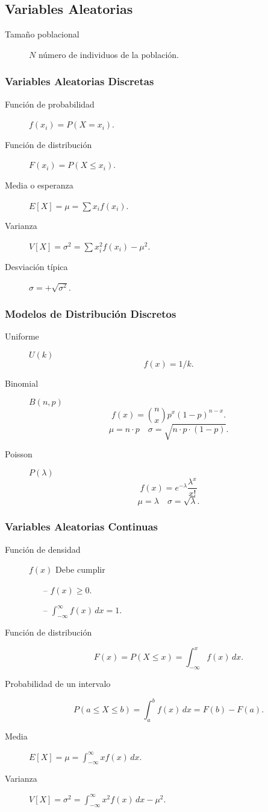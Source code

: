 \documentclass[a4paper,dvips]{article}
\newlength{\mylength}
\newenvironment{marco}{
	\setlength{\fboxsep}{5pt}
	\setlength{\mylength}{\textwidth}
	\addtolength{\mylength}{-2\fboxsep}
	\addtolength{\mylength}{-2\fboxrule}
	\noindent
	\begin{Sbox}
	\begin{minipage}{\mylength}
	\setlength{\abovedisplayskip}{3pt}
	\setlength{\belowdisplayskip}{3pt}
}
{
	\end{minipage}
	\end{Sbox}
	\fbox{\TheSbox}
}
\begin{document}
\subsection*{Variables Aleatorias}
\begin{marco}
\begin{multicols}{2}
\begin{description}
\item [Tamaño poblacional] $N$ número de individuos de la población.
\end{description}
\subsubsection*{Variables Aleatorias Discretas}
\begin{description}
\item [Función de probabilidad] $f(x_i)=P(X=x_i)$.
\item [Función de distribución] $F(x_i)=P(X\leq x_i)$.
\item [Media o esperanza] $E[X]=\mu=\sum x_if(x_i)$.
\item [Varianza] $V[X]=\sigma^2=\sum x_i^2f(x_i)-\mu^2$.
\item [Desviación típica] $\sigma=+\sqrt{\sigma^2}$.
\end{description}
\subsubsection*{Modelos de Distribución Discretos}
\begin{description}
\item [Uniforme] $U(k)$
\[f(x)=1/k.\]
\item [Binomial] $B(n,p)$
\[f(x)=\binom{n}{x}p^x(1-p)^{n-x}.\]
\[\mu=n\cdot p\quad \sigma=\sqrt{n\cdot p\cdot (1-p)}.\]
\item [Poisson] $P(\lambda)$
\[f(x)=e^{-\lambda}\frac{\lambda^x}{x!}\]
\[\mu=\lambda\quad \sigma=\sqrt{\lambda}.\]
\end{description}
\subsubsection*{Variables Aleatorias Continuas}
\begin{description}
\item [Función de densidad] $f(x)$ Debe cumplir
\begin{itemize}
\item[--]$f(x)\geq 0$.
\item[--]$\int_{-\infty}^\infty f(x)\,dx=1$.
\end{itemize}
\item [Función de distribución] \[F(x)=P(X\leq x)=\int_{-\infty}^x f(x)\,dx.\]
\item [Probabilidad de un intervalo]
\[P(a\leq X\leq b)=\int_a^b f(x)\,dx=F(b)-F(a).\]
\item [Media] $E[X]=\mu=\int_{-\infty}^\infty xf(x)\,dx$.
\item [Varianza] $V[X]=\sigma^2=\int_{-\infty}^\infty x^2f(x)\,dx-\mu^2$.
\end{description}

\end{multicols}
\end{marco}
\end{document}
